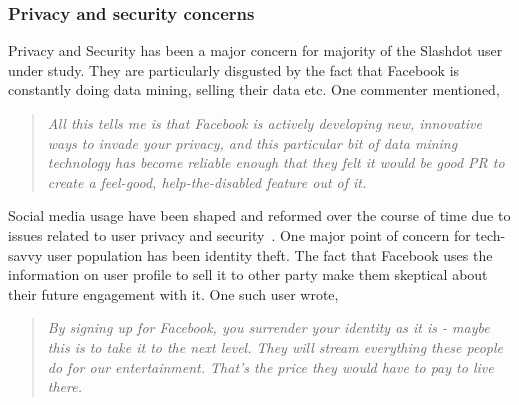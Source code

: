  \subsubsection{Privacy and security concerns }
 Privacy and Security has been a major concern for majority of the Slashdot user under study. They are particularly disgusted by the fact that Facebook is constantly doing data mining, selling their data etc. One commenter mentioned,
     \begin{quote}
         \textit{All this tells me is that Facebook is actively developing new, innovative ways to invade your privacy, and this particular bit of data mining technology has become reliable enough that they felt it would be good PR to create a feel-good, help-the-disabled feature out of it. }
     \end{quote}
     
     Social media usage have been shaped and reformed over the course of time due to issues related to user privacy and security~\cite{vitak2015balancing}. One major point of concern for tech-savvy user population has been identity theft. The fact that Facebook uses the information on user profile to sell it to other party make them skeptical about their future engagement with it. One such user wrote,
     \begin{quote}
         \textit{By signing up for Facebook, you surrender your identity as it is - maybe this is to take it to the next level. They will stream everything these people do for our entertainment. That's the price they would have to pay to live there.}
    \end{quote}
    

